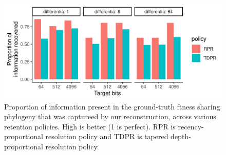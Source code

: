 \begin{figure}
    \includegraphics[width=\columnwidth]{img/info_plot}
    \caption{
    Proportion of information present in the ground-truth ftness sharing phylogeny that was captureed by our reconstruction, across various retention policies.
    High is better (1 is perfect).
    RPR is recency-proportional resolution policy and TDPR is tapered depth-proportional resolution policy.
    } \label{fig:info_plot}
\end{figure}

